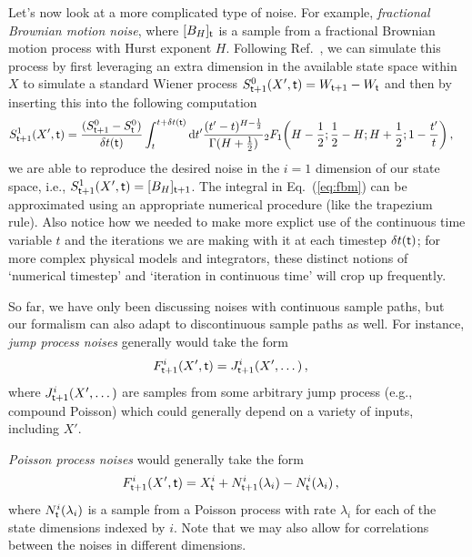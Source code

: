 \documentclass{book}
\begin{document}
Let's now look at a more complicated type of noise. For example, \emph{fractional Brownian motion noise}, where $[B_{H}]_{\sf t}$ is a sample from a fractional Brownian motion process with Hurst exponent $H$. Following Ref.~\cite{decreusefond1999stochastic}, we can simulate this process by first leveraging an extra dimension in the available state space within $X$ to simulate a standard Wiener process $S^{0}_{{\sf t}+1}(X',{\sf t}) = W_{{\sf t}+1} - W_{\sf t}$ and then by inserting this into the following computation
\begin{align}
S^{1}_{{\sf t}+1}(X',{\sf t}) &= \frac{(S^{0}_{{\sf t}+1} - S^{0}_{\sf t})}{\delta t({\sf t})}\int^{t+\delta t({\sf t})}_{t}{\rm d}t' \frac{(t'-t)^{H-\frac{1}{2}}}{\Gamma (H+\frac{1}{2})} {}_2F_1 \bigg( H-\frac{1}{2};\frac{1}{2}-H;H+\frac{1}{2};1-\frac{t'}{t}\bigg) \label{eq:fbm} \,,
\end{align}
we are able to reproduce the desired noise in the $i=1$ dimension of our state space, i.e., $S^{1}_{{\sf t}+1}(X',{\sf t})=[B_{H}]_{{\sf t}+1}$. The integral in Eq.~(\ref{eq:fbm}) can be approximated using an appropriate numerical procedure (like the trapezium rule). Also notice how we needed to make more explict use of the continuous time variable $t$ and the iterations we are making with it at each timestep $\delta t({\sf t})$; for more complex physical models and integrators, these distinct notions of `numerical timestep' and `iteration in continuous time' will crop up frequently.

So far, we have only been discussing noises with continuous sample paths, but our formalism can also adapt to discontinuous sample paths as well. For instance, \emph{jump process noises} generally would take the form
\begin{align}
& F^{i}_{{\sf t}+1}(X',{\sf t})= J^i_{{\sf t}+1}(X', \dots )\,,
\end{align}
where $J^i_{{\sf t}+1}(X', \dots )$ are samples from some arbitrary jump process (e.g., compound Poisson) which could generally depend on a variety of inputs, including $X'$. 

\emph{Poisson process noises} would generally take the form
\begin{align}
& F^{i}_{{\sf t}+1}(X',{\sf t}) = X^i_{\sf t} + N^i_{{\sf t}+1}({\lambda_i})-N^i_{\sf t}({\lambda_i})\,,
\end{align}
where $N^i_{\sf t}({\lambda_i})$ is a sample from a Poisson process with rate $\lambda_i$ for each of the state dimensions indexed by $i$. Note that we may also allow for correlations between the noises in different dimensions.
\end{document}
